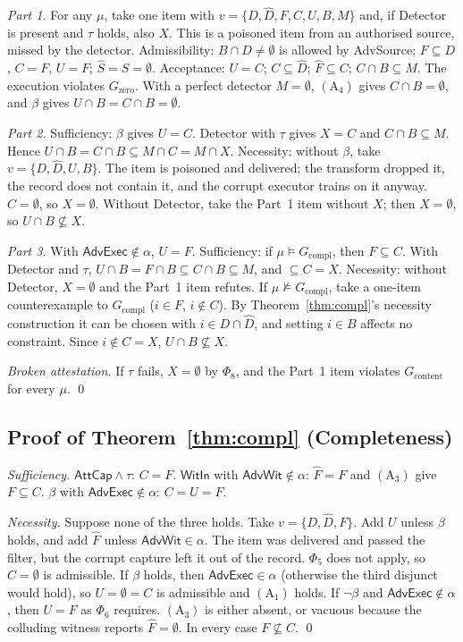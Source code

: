 \emph{Part 1.} For any $\mu$, take one item with $v=\{D,\hat D,F,C,U,B,M\}$ and, if
\textsf{Detector} is present and $\tau$ holds, also $X$. This is a poisoned item from an
authorised source, missed by the detector. Admissibility: $B\cap D\neq\emptyset$ is
allowed by \textsf{AdvSource}; $F\subseteq D$, $C=F$, $U=F$; $\hat S=S=\emptyset$. Acceptance:
$U=C$; $C\subseteq\hat D$; $\hat F\subseteq C$; $C\cap B\subseteq M$. The execution violates
$G_{\mathrm{zero}}$. With a perfect detector $M=\emptyset$, $(\mathrm A_4)$ gives
$C\cap B=\emptyset$, and $\beta$ gives $U\cap B=C\cap B=\emptyset$.

\emph{Part 2.} Sufficiency: $\beta$ gives $U=C$. \textsf{Detector} with $\tau$ gives $X=C$
and $C\cap B\subseteq M$. Hence $U\cap B=C\cap B\subseteq M\cap C=M\cap X$. Necessity:
without $\beta$, take $v=\{D,\hat D,U,B\}$. The item is poisoned and delivered; the transform
dropped it, the record does not contain it, and the corrupt executor trains on it anyway.
$C=\emptyset$, so $X=\emptyset$.
Without \textsf{Detector}, take the Part~1 item without $X$; then $X=\emptyset$, so
$U\cap B\not\subseteq X$.

\emph{Part 3.} With $\textsf{AdvExec}\notin\alpha$, $U=F$. Sufficiency: if
$\mu\models G_{\mathrm{compl}}$, then $F\subseteq C$. With \textsf{Detector} and $\tau$,
$U\cap B=F\cap B\subseteq C\cap B\subseteq M$, and $\subseteq C=X$. Necessity: without
\textsf{Detector}, $X=\emptyset$ and the Part~1 item refutes. If
$\mu\not\models G_{\mathrm{compl}}$, take a one-item counterexample to $G_{\mathrm{compl}}$
($i\in F$, $i\notin C$). By Theorem~\ref{thm:compl}'s necessity construction it can be
chosen with $i\in D\cap\hat D$, and setting $i\in B$ affects no constraint. Since
$i\notin C=X$, $U\cap B\not\subseteq X$.

\emph{Broken attestation.} If $\tau$ fails, $X=\emptyset$ by $\Phi_8$, and the Part~1 item
violates $G_{\mathrm{content}}$ for every $\mu$. \qed

\subsection*{Proof of Theorem~\ref{thm:compl} (Completeness)}

\emph{Sufficiency.} $\textsf{AttCap}\wedge\tau$: $C=F$. $\textsf{WitIn}$ with
$\textsf{AdvWit}\notin\alpha$: $\hat F=F$ and $(\mathrm A_3)$ give $F\subseteq C$.
$\beta$ with $\textsf{AdvExec}\notin\alpha$: $C=U=F$.

\emph{Necessity.} Suppose none of the three holds. Take $v=\{D,\hat D,F\}$. Add $U$ unless $\beta$ holds, and add
$\hat F$ unless $\textsf{AdvWit}\in\alpha$. The item was delivered and passed the filter,
but the corrupt capture left it out of the record. $\Phi_5$ does not apply, so
$C=\emptyset$ is admissible. If $\beta$ holds, then $\textsf{AdvExec}\in\alpha$ (otherwise
the third disjunct would hold), so $U=\emptyset=C$ is admissible and $(\mathrm A_1)$
holds. If $\neg\beta$ and $\textsf{AdvExec}\notin\alpha$, then $U=F$ as $\Phi_6$ requires.
$(\mathrm A_3)$ is either absent, or vacuous because the colluding witness reports
$\hat F=\emptyset$. In every case $F\not\subseteq C$. \qed

